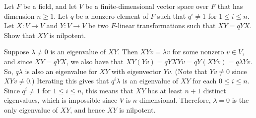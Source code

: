 %
\begin{question}[subtitle=January 2015 Problem 4, ID=Jan15_4]
Let $F$ be a field, and let $V$ be a finite-dimensional vector space over $F$ that has dimension $n \geq 1$. Let $q$ be a nonzero element of $F$ such that $q^i \neq 1$ for $1 \leq i \leq n$. Let $X: V \to V$ and $Y: V \to V$ be two $F$-linear transformations such that $XY=qYX$. Show that $XY$ is nilpotent.
\end{question}
\begin{solution}

Suppose $\lambda \neq 0$ is an eigenvalue of $XY$. Then $XYv=\lambda v$ for some nonzero $v \in V$, and since $XY=qYX$, we also have that $XY(Yv)=qYXYv=qY(XYv)=q\lambda Yv$. So, $q\lambda$ is also an eigenvalue for $XY$ with eigenvector $Yv$. (Note that $Yv \neq 0$ since $XYv \neq 0$.) Iterating this gives that $q^{i} \lambda$ is an eigenvalue of $XY$ for each $0 \leq i \leq n$. Since $q^i\neq 1$ for $1 \leq i \leq n$, this means that $XY$ has at least $n+1$ distinct eigenvalues, which is impossible since $V$ is $n$-dimensional. Therefore, $\lambda = 0$ is the only eigenvalue of $XY$, and hence $XY$ is nilpotent.
\end{solution}

